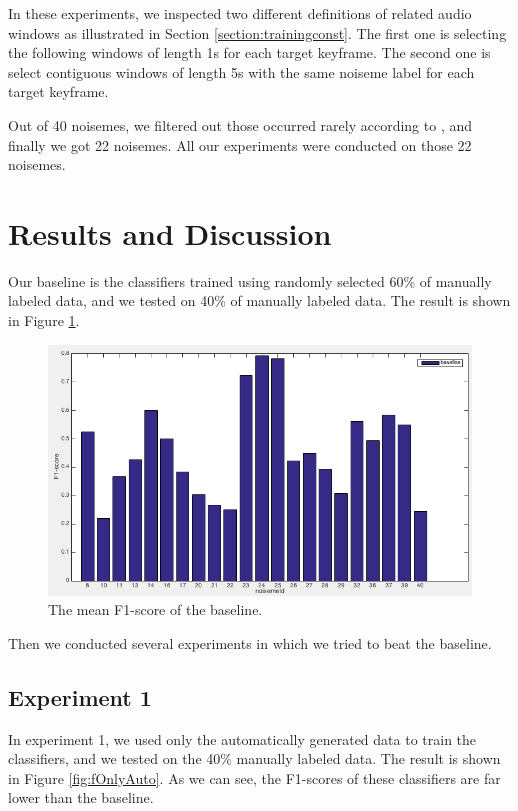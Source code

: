 \documentclass[conference, 11pt, onecolumn]{IEEEtran}
\begin{document}
In these experiments, we inspected two different definitions of related audio windows as illustrated in Section \ref{section:trainingconst}.
The first one is selecting the following windows of length 1s for each target keyframe. The second one is select contiguous windows of length 5s with the same noiseme label for each target keyframe. 

Out of 40 noisemes, we filtered out those occurred rarely according to \cite{wang2014exploring}, and finally we got 22 noisemes. All our experiments were conducted on those 22 noisemes.

\section{Results and Discussion}
\label{section:results}

Our baseline is the classifiers trained using randomly selected 60\% of manually labeled data, and we tested on 40\% of manually labeled data.
The result is shown in Figure \ref{fig:baseline}.

\begin{figure}[h!]
\centering
\includegraphics[scale=0.45]{figure/baseline.png}
\caption{The mean F1-score of the baseline.}
\label{fig:baseline}
\end{figure}

Then we conducted several experiments in which we tried to beat the baseline.
\subsection{Experiment 1}
In experiment 1, we used only the automatically generated data to train the classifiers, and we tested on the 40\% manually labeled data. 
The result is shown in Figure \ref{fig:fOnlyAuto}. As we can see, the F1-scores of these classifiers are far lower than the baseline.
\end{document}
